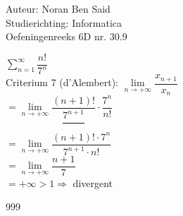 \documentclass[a4paper]{article}
\begin{document}
  
\noindent \large Auteur: Noran Ben Said \\
\noindent \large Studierichting: Informatica\\
\noindent \large Oefeningenreeks 6D nr. 30.9\\

\medskip

\normalsize

$\displaystyle\sum\limits_{n=1}^{\infty} \dfrac{n!}{7^n}$ \\

Criterium 7 (d'Alembert): $\lim\limits_{n \to +\infty} \dfrac{x_{n+1}}{x_n}$ \\

$= \lim\limits_{n \to +\infty} \dfrac{(n+1)!}{\dfrac{7^{n+1}}{}} \cdot \dfrac{7^n}{n!}$ \\

$= \lim\limits_{n \to +\infty} \dfrac{(n+1)! \cdot 7^n}{7^{n+1} \cdot n!}$ \\

$= \lim\limits_{n \to +\infty} \dfrac{n+1}{7}$ \\

$= +\infty > 1 \Rightarrow$ divergent \\


\begin{thebibliography}{999}
\end{thebibliography}
\end{document}
